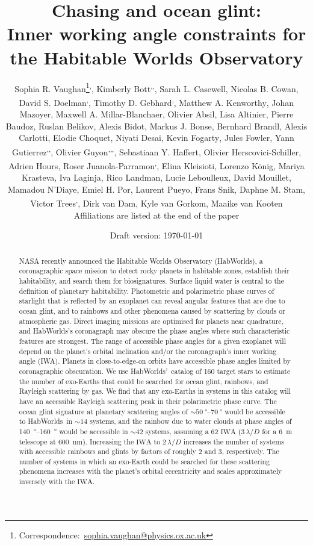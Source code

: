 \documentclass[
    usenatbib,
]{mnras}
\title{Chasing \rainbows{} and ocean glint:\\  Inner working angle constraints for the Habitable Worlds Observatory}
\author[Sophia R. Vaughan et al.]{%
    Sophia R. Vaughan\thanks{Correspondence:~\url{sophia.vaughan@physics.ox.ac.uk}}\textsuperscript{,\afflink{1}},
    Kimberly Bott\textsuperscript{\afflink{2},\afflink{3},\afflink{4}},
    Sarah L. Casewell\textsuperscript{\afflink{5}},
    Nicolas B. Cowan\textsuperscript{\afflink{6}},
    David S. Doelman\textsuperscript{\afflink{7},\afflink{8}},
    \newauthor
    Timothy D. Gebhard\textsuperscript{\afflink{9},\afflink{10}},
    Matthew A.  Kenworthy\textsuperscript{\afflink{7}},
    Johan Mazoyer\textsuperscript{\afflink{11}},
    Maxwell A. Millar-Blanchaer\textsuperscript{\afflink{12}},
    \newauthor
    Olivier Absil\textsuperscript{\afflink{13}},
    Lisa Altinier\textsuperscript{\afflink{14}},
    Pierre Baudoz\textsuperscript{\afflink{11}},
    Ruslan Belikov\textsuperscript{\afflink{15}},
    Alexis Bidot\textsuperscript{\afflink{16}},
    Markus J. Bonse\textsuperscript{\afflink{10}},
    \newauthor
    Bernhard Brandl\textsuperscript{\afflink{7}},
    Alexis Carlotti\textsuperscript{\afflink{16}},
    Elodie Choquet\textsuperscript{\afflink{14}},
    Niyati Desai\textsuperscript{\afflink{17}},
    Kevin Fogarty\textsuperscript{\afflink{15}},
    Jules Fowler\textsuperscript{\afflink{18}},
    \newauthor
    Yann Gutierrez\textsuperscript{\afflink{11},\afflink{19},\afflink{20}},
    Olivier Guyon\textsuperscript{\afflink{21},\afflink{22},\afflink{23},\afflink{24}},
    Sebastiaan Y. Haffert\textsuperscript{\afflink{21}},
    Olivier Herscovici-Schiller\textsuperscript{\afflink{19}},
    \newauthor
    Adrien Hours\textsuperscript{\afflink{16}},
    Roser Juanola-Parramon\textsuperscript{\afflink{25},\afflink{26}},
    Elina Kleisioti\textsuperscript{\afflink{7}},
    Lorenzo König\textsuperscript{\afflink{13}},
    Mariya Krasteva\textsuperscript{\afflink{27}},
    \newauthor
    Iva Laginja\textsuperscript{\afflink{11}},
    Rico Landman\textsuperscript{\afflink{7}},
    Lucie Leboulleux\textsuperscript{\afflink{16}},
    David Mouillet\textsuperscript{\afflink{16}},
    Mamadou N’Diaye\textsuperscript{\afflink{28}},
    \newauthor
    Emiel H. Por\textsuperscript{\afflink{29}},
    Laurent Pueyo\textsuperscript{\afflink{29}},
    Frans Snik\textsuperscript{\afflink{7}},
    Daphne M. Stam\textsuperscript{\afflink{30}},
    Victor Trees\textsuperscript{\afflink{31},\afflink{32}},
    Dirk van Dam\textsuperscript{\afflink{7}},
    \newauthor
    Kyle van Gorkom\textsuperscript{\afflink{21}},
    Maaike van Kooten\textsuperscript{\afflink{33}}
    \newauthor \\%
    Affiliations are listed at the end of the paper
}
\date{Draft version: \today}
\newcommand{\IWA}{\ensuremath{\mathrm{IWA}}}
\newcommand{\hwo}{HabWorlds}
\begin{document}
 

\maketitle

\begin{abstract}
NASA recently announced the Habitable Worlds Observatory (\hwo), a coronagraphic space mission to detect rocky planets in habitable zones, establish their habitability, and search them for biosignatures. 
Surface liquid water is central to the definition of planetary habitability.
%
Photometric and polarimetric phase curves of starlight that is reflected by an exoplanet can reveal angular features that are due to ocean glint, and to rainbows and other phenomena caused by scattering by clouds or atmospheric gas.
%
Direct imaging missions are optimised for planets near quadrature, and \hwo's coronagraph may obscure the phase angles where such characteristic features are strongest. 
%
The range of accessible phase angles for a given exoplanet will depend on the planet's orbital inclination and/or the coronagraph's inner working angle (IWA). 
%
Planets in close-to-edge-on orbits have accessible phase angles limited by coronagraphic obscuration. 
%
We use \hwo'~catalog of 160 target stars to estimate the number of exo-Earths that could be searched for ocean glint, rainbows, and Rayleigh scattering by gas. 
%
We find that any exo-Earths in systems in this catalog will have an accessible Rayleigh scattering peak in their polarimetric phase curve. 
%
The ocean glint signature at planetary scattering angles of $\sim\qtyrange{50}{70}{\degree}$ 
would be accessible to \hwo~in $\sim\num{14}$ systems, and the rainbow due to water clouds at phase angles of \qtyrange{140}{160}{\degree} would be accessible in $\sim\num{42}$ systems, assuming a \qty{62}{\mas} \IWA{} ($3\,\lambda/D$ for a \qty{6}{\meter} telescope at \qty{600}{\nano\meter}).
%
Increasing the \IWA{} to $2\,\lambda/D$ increases the number of systems with accessible rainbows and glints by factors of roughly 2 and 3, respectively.
%
The number of systems in which an exo-Earth could be searched for these scattering phenomena increases with the planet's orbital eccentricity and scales approximately inversely with the \IWA{}.  \end{abstract}
\end{document}
